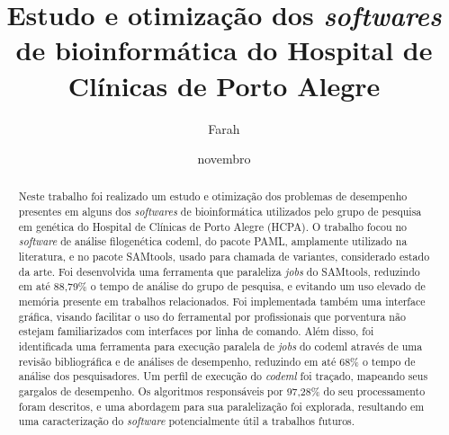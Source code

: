 \documentclass[cic,tc]{iiufrgs}
\title{Estudo e otimização dos \textit{softwares} de bioinformática do Hospital de
Clínicas de Porto Alegre}
\author{Farah}{Alef}
\date{novembro}{2021}
\begin{document}
\maketitle



\begin{abstract}
  Neste trabalho foi realizado um estudo e otimização dos problemas de
  desempenho presentes em alguns dos \textit{softwares} de bioinformática
  utilizados pelo grupo de pesquisa em genética do Hospital de Clínicas de
  Porto Alegre (HCPA). O trabalho focou no \textit{software} de análise
  filogenética codeml, do pacote PAML, amplamente utilizado na literatura, e no
  pacote SAMtools, usado para chamada de variantes, considerado estado da arte. 
  Foi desenvolvida uma ferramenta que paraleliza \textit{jobs} do SAMtools,
  reduzindo em até 88,79\% o tempo de análise do grupo de pesquisa, e evitando
  um uso elevado de memória presente em trabalhos relacionados. Foi
  implementada também uma interface gráfica, visando facilitar o uso do
  ferramental por profissionais que porventura não estejam familiarizados com
  interfaces por linha de comando.
  Além disso, foi identificada uma ferramenta para execução paralela de
  \textit{jobs} do codeml através de uma revisão bibliográfica e de análises de
  desempenho, reduzindo em até 68\% o tempo de análise dos pesquisadores. Um
  perfil de execução do \textit{codeml} foi traçado, mapeando seus gargalos de
  desempenho. Os algoritmos responsáveis por 97,28\% do seu processamento foram
  descritos, e uma abordagem para sua paralelização foi explorada, resultando
  em uma caracterização do \textit{software} potencialmente útil a trabalhos futuros.
\end{abstract}
\end{document}
